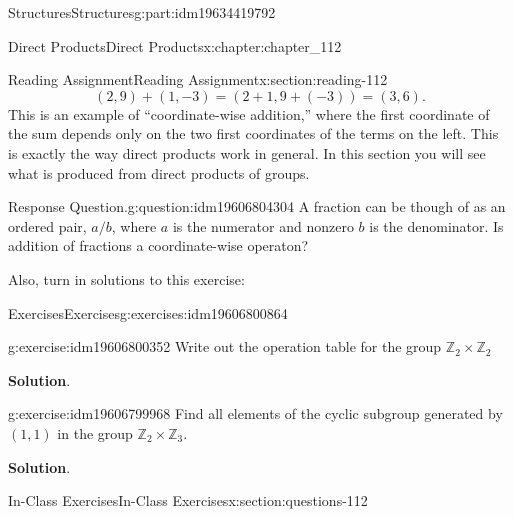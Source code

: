 \documentclass[oneside,10pt,]{book}
\newcommand{\blocktitlefont}{\relax}
\numberwithin{equation}{section}
\begin{document}
\begin{partptx}{Structures}{}{Structures}{}{}{g:part:idm19634419792}
\begin{chapterptx}{Direct Products}{}{Direct Products}{}{}{x:chapter:chapter_112}
\begin{sectionptx}{Reading Assignment}{}{Reading Assignment}{}{}{x:section:reading-112}
\begin{equation*}
(2,9)+(1,-3) = (2+1,9+(-3))=(3,6).
\end{equation*}
This is an example of ``coordinate-wise addition,'' where the first coordinate of the sum depends only on the two first coordinates of the terms on the left. This is exactly the way direct products work in general. In this section you will see what is produced from direct products of groups.%
\begin{question}{Response Question.}{g:question:idm19606804304}%
A fraction can be though of as an ordered pair, \(a/b\), where \(a\) is the numerator and nonzero \(b\) is the denominator.  Is addition of fractions a coordinate-wise operaton?%
\end{question}
Also, turn in solutions to this exercise:%
%
%
\typeout{************************************************}
\typeout{************************************************}
%
\begin{exercises-subsection-numberless}{Exercises}{}{Exercises}{}{}{g:exercises:idm19606800864}
\par\medskip\noindent%
%
\begin{exercisegroup}
\begin{divisionexerciseeg}{1}{}{}{g:exercise:idm19606800352}%
Write out the operation table for the group \(\mathbb{Z}_2 \times \mathbb{Z}_2\)%
\par\smallskip%
\noindent\textbf{\blocktitlefont Solution}.\hypertarget{g:solution:idm19606800224}{}\quad{}%
\end{divisionexerciseeg}%
\begin{divisionexerciseeg}{2}{}{}{g:exercise:idm19606799968}%
Find all elements of the cyclic subgroup generated by \((1,1)\) in the group \(\mathbb{Z}_2 \times \mathbb{Z}_3\).%
\par\smallskip%
\noindent\textbf{\blocktitlefont Solution}.\hypertarget{g:solution:idm19606799024}{}\quad{}%
\end{divisionexerciseeg}%
\end{exercisegroup}
\par\medskip\noindent
\end{exercises-subsection-numberless}
\end{sectionptx}
%
%
\typeout{************************************************}
\typeout{************************************************}
%
\begin{sectionptx}{In-Class Exercises}{}{In-Class Exercises}{}{}{x:section:questions-112}

\end{sectionptx}
\end{chapterptx}
\end{partptx}
\end{document}
